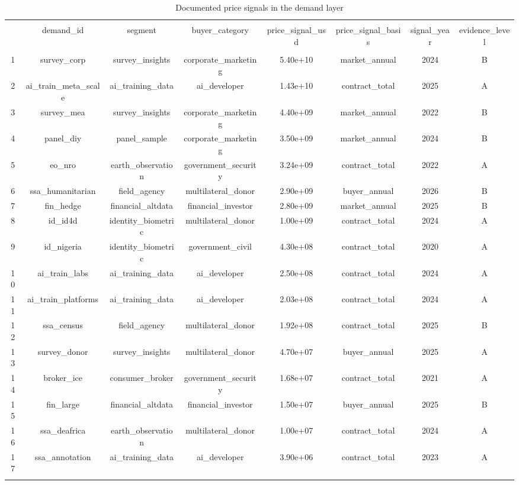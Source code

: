 
\begin{table}[!htbp] \centering 
  \caption{Documented price signals in the demand layer} 
  \label{} 
\begin{tabular}{@{\extracolsep{5pt}} cccccccc} 
\\[-1.8ex]\hline 
\hline \\[-1.8ex] 
 & demand\_id & segment & buyer\_category & price\_signal\_usd & price\_signal\_basis & signal\_year & evidence\_level \\ 
\hline \\[-1.8ex] 
1 & survey\_corp & survey\_insights & corporate\_marketing & 5.40e+10 & market\_annual & 2024 & B \\ 
2 & ai\_train\_meta\_scale & ai\_training\_data & ai\_developer & 1.43e+10 & contract\_total & 2025 & A \\ 
3 & survey\_mea & survey\_insights & corporate\_marketing & 4.40e+09 & market\_annual & 2022 & B \\ 
4 & panel\_diy & panel\_sample & corporate\_marketing & 3.50e+09 & market\_annual & 2024 & B \\ 
5 & eo\_nro & earth\_observation & government\_security & 3.24e+09 & contract\_total & 2022 & A \\ 
6 & ssa\_humanitarian & field\_agency & multilateral\_donor & 2.90e+09 & buyer\_annual & 2026 & B \\ 
7 & fin\_hedge & financial\_altdata & financial\_investor & 2.80e+09 & market\_annual & 2025 & B \\ 
8 & id\_id4d & identity\_biometric & multilateral\_donor & 1.00e+09 & contract\_total & 2024 & A \\ 
9 & id\_nigeria & identity\_biometric & government\_civil & 4.30e+08 & contract\_total & 2020 & A \\ 
10 & ai\_train\_labs & ai\_training\_data & ai\_developer & 2.50e+08 & contract\_total & 2024 & A \\ 
11 & ai\_train\_platforms & ai\_training\_data & ai\_developer & 2.03e+08 & contract\_total & 2024 & A \\ 
12 & ssa\_census & field\_agency & multilateral\_donor & 1.92e+08 & contract\_total & 2025 & B \\ 
13 & survey\_donor & survey\_insights & multilateral\_donor & 4.70e+07 & buyer\_annual & 2025 & A \\ 
14 & broker\_ice & consumer\_broker & government\_security & 1.68e+07 & contract\_total & 2021 & A \\ 
15 & fin\_large & financial\_altdata & financial\_investor & 1.50e+07 & buyer\_annual & 2025 & B \\ 
16 & ssa\_deafrica & earth\_observation & multilateral\_donor & 1.00e+07 & contract\_total & 2024 & A \\ 
17 & ssa\_annotation & ai\_training\_data & ai\_developer & 3.90e+06 & contract\_total & 2023 & A \\ 
\hline \\[-1.8ex] 
\end{tabular} 
\end{table} 
